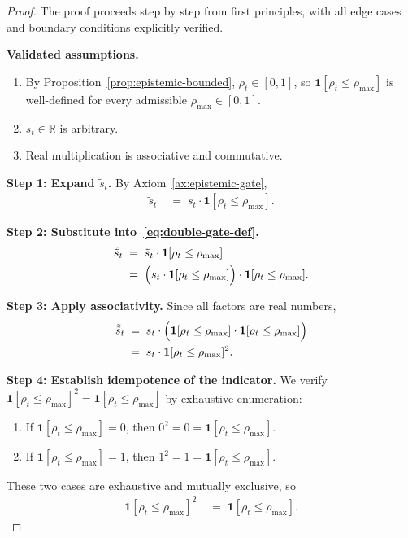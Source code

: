 \documentclass[12pt,openany]{book}
\numberwithin{equation}{chapter}
\theoremstyle{plain}
\theoremstyle{definition}
\theoremstyle{remark}
\numberwithin{equation}{chapter}
\theoremstyle{plain}
\begin{document}
\begin{proof}
The proof proceeds step by step from first principles, with all
edge cases and boundary conditions explicitly verified.

\medskip
\noindent\textbf{Validated assumptions.}
\begin{enumerate}
  \item By Proposition~\ref{prop:epistemic-bounded},
        $\rho_t \in [0,1]$, so
        $\mathbf{1}[\rho_t \leq \rho_{\max}]$ is well-defined
        for every admissible $\rho_{\max} \in [0,1]$.
  \item $s_t \in \mathbb{R}$ is arbitrary.
  \item Real multiplication is associative and commutative.
\end{enumerate}

\medskip
\noindent\textbf{Step 1: Expand $\tilde{s}_t$.}
By Axiom~\ref{ax:epistemic-gate},
\begin{align}
  \tilde{s}_t
  &\;=\; s_t \cdot \mathbf{1}[\rho_t \leq \rho_{\max}].
  \label{eq:idem-s1}
\end{align}

\medskip
\noindent\textbf{Step 2: Substitute into~\eqref{eq:double-gate-def}.}
\begin{align}
  \tilde{\tilde{s}}_t
  &\;=\; \tilde{s}_t \cdot \mathbf{1}[\rho_t \leq \rho_{\max}]
  \notag\\
  &\;=\; \Bigl(s_t \cdot \mathbf{1}[\rho_t \leq \rho_{\max}]\Bigr)
         \cdot \mathbf{1}[\rho_t \leq \rho_{\max}].
  \label{eq:idem-s2}
\end{align}

\medskip
\noindent\textbf{Step 3: Apply associativity.}
Since all factors are real numbers,
\begin{align}
  \tilde{\tilde{s}}_t
  &\;=\; s_t \cdot \Bigl(
         \mathbf{1}[\rho_t \leq \rho_{\max}]
         \cdot
         \mathbf{1}[\rho_t \leq \rho_{\max}]
         \Bigr)
  \notag\\
  &\;=\; s_t \cdot \mathbf{1}[\rho_t \leq \rho_{\max}]^{2}.
  \label{eq:idem-s3}
\end{align}

\medskip
\noindent\textbf{Step 4: Establish idempotence of the indicator.}
We verify $\mathbf{1}[\rho_t \leq \rho_{\max}]^{2}
= \mathbf{1}[\rho_t \leq \rho_{\max}]$ by exhaustive enumeration:
\begin{enumerate}
  \item If $\mathbf{1}[\rho_t \leq \rho_{\max}] = 0$, then
        $0^{2} = 0 = \mathbf{1}[\rho_t \leq \rho_{\max}]$.
  \item If $\mathbf{1}[\rho_t \leq \rho_{\max}] = 1$, then
        $1^{2} = 1 = \mathbf{1}[\rho_t \leq \rho_{\max}]$.
\end{enumerate}
These two cases are exhaustive and mutually exclusive, so
\begin{align}
  \mathbf{1}[\rho_t \leq \rho_{\max}]^{2}
  &\;=\;
  \mathbf{1}[\rho_t \leq \rho_{\max}].
  \label{eq:idem-ind}
\end{align}


\end{proof}
\end{document}
